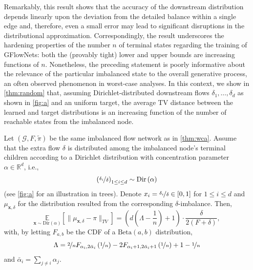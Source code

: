 Remarkably, this result shows that the accuracy of the downstream distribution depends linearly upon the deviation from the detailed balance within a single edge and, therefore, even a small error may lead to significant disruptions in the distributional approximation. Correspondingly, the result underscores the hardening properties of the number $n$ of terminal states regarding the training of GFlowNets: both the (provably tight) lower and upper bounds are increasing functions of $n$. Nonetheless, the preceding statement is poorly informative about the relevance of the particular imbalanced state to the overall generative process, an often observed phenomenon in worst-case analyses. In this context, we show in \autoref{thm:random} that, assuming Dirichlet-distributed downstream flows $\delta_{1}, \dots, \delta_{d}$ as shown in \autoref{fig:a} and an uniform target, the average TV distance between the learned and target distributions is an increasing function of the number of reachable states from the imbalanced node.  

\begin{theorem}\label{thm:random} 
    Let $(\mathcal{G}, F, \tilde{\pi})$ be the same imbalanced flow network as in \autoref{thm:wca}. Assume that the extra flow $\delta$ is distributed among the imbalanced node's terminal children according to a Dirichlet distribution with concentration parameter $\alpha \in \mathbb{R}^{d}$, i.e., 
    \begin{equation*}
        \left(\nicefrac{\delta_{i}}{\delta}\right)_{1 \le i \le d} \sim \textrm{Dir}\left(\alpha\right) %
    \end{equation*}
    (see \autoref{fig:a} for an illustration in trees). Denote $x_{i} = \nicefrac{\delta_{i}}{\delta} \in [0, 1]$ for $1 \le i \le d$ and $\mu_{\mathbf{x}, \delta}$ for the distribution resulted from the corresponding $\delta$-imbalance. Then, 
    \begin{equation*}
        \underset{\mathbf{x} \sim \textrm{Dir}(\alpha)}{\mathbb{E}} \left[ \|\mu_{\mathbf{x}, \delta} - \pi\|_{TV} \right] = \left( d \left( \Lambda - \frac{1}{n} \right) + 1 \right) \cdot \frac{\delta}{2(F + \delta)}, %
    \end{equation*}
    with, by letting $F_{a,  b}$ be the CDF of a $\textrm{Beta}(a, b)$ distribution,  
    \begin{equation*}
        \Lambda = \nicefrac{2}{n} F_{\alpha_{i}, 2\bar{\alpha}_{i}} \left( \nicefrac{1}{n} \right) - 2 F_{\alpha_{i} + 1, 2\bar{\alpha}_{i} + 1} \left( \nicefrac{1}{n} \right) + 1 - \nicefrac{1}{n} %
    \end{equation*}
    and $\bar{\alpha}_{i} = \sum_{j \neq i} \alpha_{j}$. 
\end{theorem}

